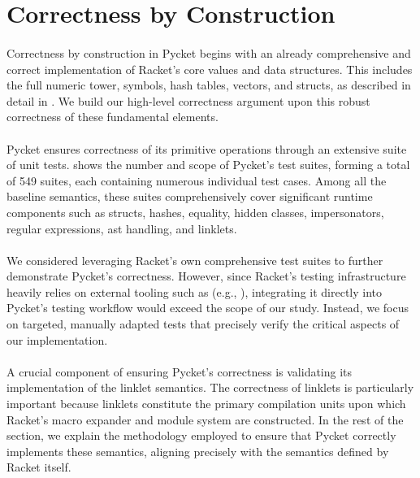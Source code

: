 	\section[\texorpdfstring{Correctness by Construction}{Correctness}]{Correctness by Construction}

		\paragraph{}%
			Correctness by construction in Pycket begins with an already comprehensive and correct implementation of Racket's core values and data structures. This includes the full numeric tower, symbols, hash tables, vectors, and structs, as described in detail in \cite{pycketmain}. We build our high-level correctness argument upon this robust correctness of these fundamental elements.


		\paragraph{}%
			Pycket ensures correctness of its primitive operations through an extensive suite of unit tests.  shows the number and scope of Pycket's test suites, forming a total of 549 suites, each containing numerous individual test cases. Among all the baseline semantics, these suites comprehensively cover significant runtime components such as structs, hashes, equality, hidden classes, impersonators, regular expressions, \gls{ast} handling, and linklets.

		\paragraph{}%
			We considered leveraging Racket’s own comprehensive test suites to further demonstrate Pycket's correctness. However, since Racket’s testing infrastructure heavily relies on external tooling such as  (e.g., ), integrating it directly into Pycket's testing workflow would exceed the scope of our study. Instead, we focus on targeted, manually adapted tests that precisely verify the critical aspects of our implementation.

		\paragraph{}%
			A crucial component of ensuring Pycket’s correctness is validating its implementation of the linklet semantics. The correctness of linklets is particularly important because linklets constitute the primary compilation units upon which Racket's macro expander and module system are constructed. In the rest of the section, we explain the methodology employed to ensure that Pycket correctly implements these semantics, aligning precisely with the semantics defined by Racket itself.

